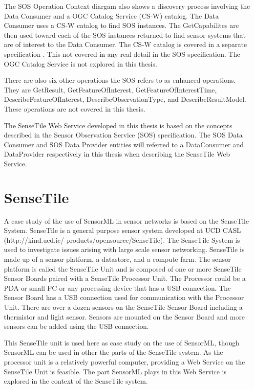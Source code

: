 \documentclass[]{final_report}
\begin{document}
The SOS Operation Context diargam also shows a discovery process involving the  Data Consumer and a OGC Catalog Service (CS-W) catalog. The Data Consumer uses a CS-W catalog to find SOS instances. The GetCapabilites are then used toward each of the SOS instances returned to find sensor systems that are of interest to the Data Consumer. The CS-W catalog is covered in a separate specification \cite{OGCcatref}. This not covered in any real detail in the SOS specification. The OGC Catalog Service is not explored in this thesis.

There are also six other operations the SOS refers to as enhanced operations. They are GetResult,
GetFeatureOfInterest, GetFeatureOfInterestTime, DescribeFeatureOfInterest,
DescribeObservationType, and DescribeResultModel. These operations are not covered in this thesis.

The SenseTile Web Service developed in this thesis is based on the concepts described in the Sensor Observation Service (SOS) specification. The SOS Data Consumer and SOS Data Provider entities will referred to a DataConsumer and DataProvider respectively in this thesis when describing the SenseTile Web Service.


\section{SenseTile}
A case study of the use of SensorML in sensor networks is based on the SenseTile System. SenseTile is a general purpose sensor system developed at UCD CASL (http://kind.ucd.ie/
products/opensource/SenseTile). The SenseTile System is used to investigate issues arising with large scale sensor networking. SenseTile is made up of a sensor platform, a datastore, and a compute farm.  The sensor platform is called the SenseTile Unit and is composed of one or more SenseTile Sensor Boards paired with a SenseTile Processor Unit. The Processor could be a PDA or small PC or any processing device that has a USB connection.  The Sensor Board has a USB connection used for communication with the Processor Unit. There are over a dozen sensors on the SenseTile Sensor Board including a thermistor and light sensor. Sensors are mounted on the Sensor Board and more sensors can be added using the USB connection.

This SenseTile unit is used here as case study on the use of SensorML, though SensorML can be used in other the parts of the SenseTile system. As the processor unit is  a relatively powerful computer, providing a Web Service on the SenseTile Unit is feasible. The part SensorML plays in this Web Service is explored in the context of the SenseTile system.
\end{document}
